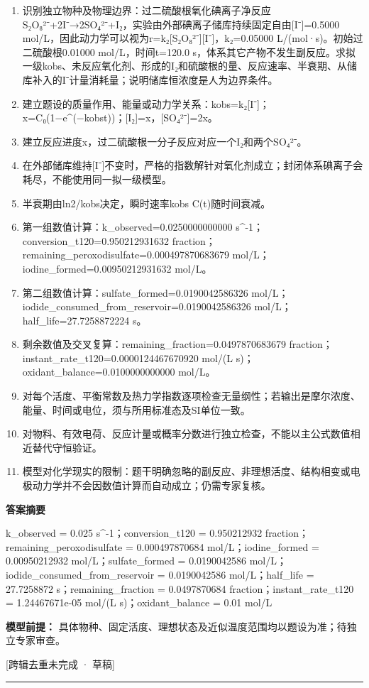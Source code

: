 \documentclass[UTF8,11pt,a4paper]{ctexart}
\begin{document}
\begin{enumerate}
\item 识别独立物种及物理边界：过二硫酸根氧化碘离子净反应S₂O₈²⁻+2I⁻→2SO₄²⁻+I₂，实验由外部碘离子储库持续固定自由[I⁻]=0.5000 mol/L，因此动力学可以视为r=k₂[S₂O₈²⁻][I⁻]，k₂=0.05000 L/(mol·s)。初始过二硫酸根0.01000 mol/L，时间t=120.0 s，体系其它产物不发生副反应。求拟一级kobs、未反应氧化剂、形成的I₂和硫酸根的量、反应速率、半衰期、从储库补入的I⁻计量消耗量；说明储库恒浓度是人为边界条件。
\item 建立题设的质量作用、能量或动力学关系：kobs=k₂[I⁻]；x=C₀(1−e\textasciicircum{}(−kobst))；[I₂]=x，[SO₄²⁻]=2x。 
\item 建立反应进度x，过二硫酸根一分子反应对应一个I₂和两个SO₄²⁻。
\item 在外部储库维持[I⁻]不变时，严格的指数解针对氧化剂成立；封闭体系碘离子会耗尽，不能使用同一拟一级模型。
\item 半衰期由ln2/kobs决定，瞬时速率kobs C(t)随时间衰减。
\item 第一组数值计算：k\_observed=0.0250000000000 s\textasciicircum{}-1；conversion\_t120=0.950212931632 fraction；remaining\_peroxodisulfate=0.000497870683679 mol/L；iodine\_formed=0.00950212931632 mol/L。
\item 第二组数值计算：sulfate\_formed=0.0190042586326 mol/L；iodide\_consumed\_from\_reservoir=0.0190042586326 mol/L；half\_life=27.7258872224 s。
\item 剩余数值及交叉复算：remaining\_fraction=0.0497870683679 fraction；instant\_rate\_t120=0.0000124467670920 mol/(L s)；oxidant\_balance=0.0100000000000 mol/L。
\item 对每个活度、平衡常数及热力学指数逐项检查无量纲性；若输出是摩尔浓度、能量、时间或电位，须与所用标准态及SI单位一致。
\item 对物料、有效电荷、反应计量或概率分数进行独立检查，不能以主公式数值相近替代守恒验证。
\item 模型对化学现实的限制：题干明确忽略的副反应、非理想活度、结构相变或电极动力学并不会因数值计算而自动成立；仍需专家复核。
\end{enumerate}
\noindent\textbf{答案摘要}\par
k\_observed = 0.025 s\textasciicircum{}-1；conversion\_t120 = 0.950212932 fraction；remaining\_peroxodisulfate = 0.000497870684 mol/L；iodine\_formed = 0.00950212932 mol/L；sulfate\_formed = 0.0190042586 mol/L；iodide\_consumed\_from\_reservoir = 0.0190042586 mol/L；half\_life = 27.7258872 s；remaining\_fraction = 0.0497870684 fraction；instant\_rate\_t120 = 1.24467671e-05 mol/(L s)；oxidant\_balance = 0.01 mol/L\par
\noindent\textbf{模型前提：}
具体物种、固定活度、理想状态及近似温度范围均以题设为准；待独立专家审查。\par
\noindent\textcolor{red!65!black}{[跨辑去重未完成 · 草稿]} \par
\medskip\hrule\medskip
{}
\end{document}
